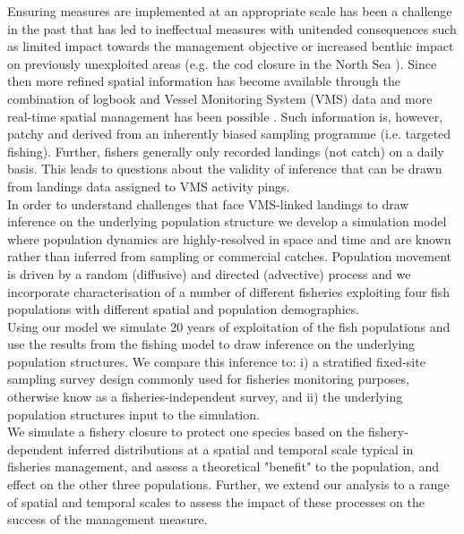 \documentclass[review]{elsarticle}
\begin{document}
Ensuring measures are implemented at an appropriate scale has been a challenge
in the past that has led to ineffectual measures with unitended consequences
such as limited impact towards the management objective or increased benthic
impact on previously unexploited areas (e.g. the cod closure in the North
Sea \citep{Rijnsdorp2001,Dinmore2003}). Since then more refined spatial
information has become available through the combination of logbook and Vessel
Monitoring System (VMS) data \citep{Lee2010, Bastardie2010, Gerritsen2012,
	Mateo2016} and more real-time spatial management has been possible 
	\citep[e.g.][]{Holmes2011}. Such information is, however, patchy and
derived from an inherently biased sampling programme (i.e. targeted fishing).
Further, fishers generally only recorded landings (not catch) on a daily
basis.
This leads to questions about the validity of inference that can be drawn from
landings data assigned to VMS activity pings. \\ 

In order to understand challenges that face VMS-linked landings to draw
inference on the underlying population structure we develop a simulation model
where population dynamics are highly-resolved in space and time and are known
rather than inferred from sampling or commercial catches. Population movement
is driven by a random (diffusive) and directed (advective) process and we
incorporate characterisation of a number of different fisheries exploiting four
fish populations with different spatial and population demographics.\\

Using our model we simulate 20 years of exploitation of the fish populations
and use the results from the fishing model to draw inference on the underlying
population structures.  We compare this inference to: i) a stratified
fixed-site sampling survey design commonly used for fisheries monitoring
purposes, otherwise know as a fisheries-independent
	survey, and ii) the underlying population structures input to the
simulation.\\

We simulate a fishery closure to protect one species based on the
fishery-dependent inferred distributions at a spatial and temporal scale
typical in fisheries management, and assess a theoretical "benefit" to the
population, and effect on the other three populations. Further, we extend our analysis
to a range of spatial and temporal scales to assess the impact of these
processes on the success of the management measure. \\
\end{document}
